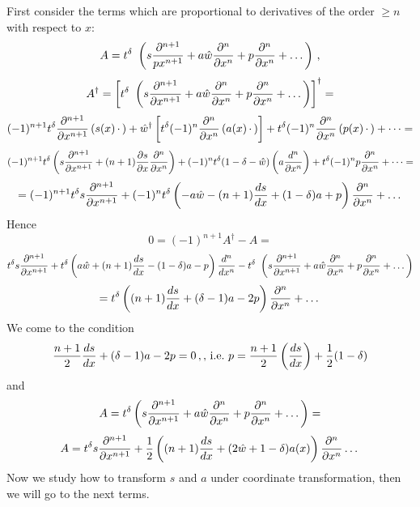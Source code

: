 First consider the terms which are proportional to derivatives of the order $\geq n$ with respect to $x$:
           $$
       A=t^\delta\
          \left(
    s{\partial^{n+1}\over p x^{n+1}}
        +a\hat w {\partial^{n}\over \partial x^{n}}+
    p{\partial^{n}\over \partial x^{n}}
               +
            \dots
          \right)\,,
           $$
             $$
           A^\dagger=
             \left[
            t^\delta\
          \left(
    s{\partial^{n+1}\over \partial x^{n+1}}
        +a\hat w {\partial^{n}\over \partial x^{n}}+
    p{\partial^{n}\over \partial x^{n}}
               +
            \dots
          \right)
          \right]^\dagger=
             $$
        $$
        (-1)^{n+1}
    t^\delta {\partial^{n+1}\over \partial x^{n+1}}
    \left(s(x) \,\cdot\,\right)+
    \hat w^\dagger\left[t^\delta (-1)^n{\partial^{n}\over \partial x^{n}} \left(a(x) \,\cdot\,\right)\right]+
    t^\delta (-1)^n{\partial^{n}\over \partial x^{n}} \left(p(x) \,\cdot\,\right)+\dots=
        $$
        $$
        (-1)^{n+1}t^\delta
        \left(
    s{\partial^{n+1}\over \partial x^{n+1}}
    + (n+1) {\partial s\over \partial x}{\partial^{n}\over \partial x^{n}}\right)+
            (-1)^nt^\delta(1-\delta-\hat w)\left(a{d^{n}\over \partial x^{n}}\right)+
    t^\delta (-1)^np{\partial^{n}\over \partial x^{n}}+\dots=
        $$
        $$
=   (-1)^{n+1}
            t^\delta s{\partial^{n+1}\over \partial x^{n+1}}
    +
            (-1)^nt^\delta
            \left(-a\hat w
            -(n+1) {ds\over dx}
            +(1-\delta) a+
             p\right){\partial^{n}\over \partial x^{n}}
        +\dots
                $$
Hence
                  $$
      0=  (-1)^{n+1}A^\dagger-A=
                   $$
                   $$
       t^\delta s{\partial ^{n+1}\over \partial x^{n+1}}
                  +
            t^\delta
            \left(a\hat w
            +(n+1) {ds\over dx}
            -(1-\delta) a-
             p\right){d^{n}\over dx^{n}}
             -t^\delta\
          \left(
    s{\partial^{n+1}\over \partial x^{n+1}}
        +a\hat w {\partial^{n}\over \partial x^{n}}+
    p{\partial^{n}\over \partial x^{n}}
               +
            \dots
          \right)
                  $$
                  $$
      =t^\delta
            \left((n+1) {ds\over dx}
            +(\delta-1) a-2p
               \right){\partial^{n}\over \partial x^{n}}+\dots
                  $$
    We come to the condition
               $$
               {n+1\over 2}{ds\over dx}
            +(\delta-1) a-2p=0\,,,\,{\rm i.e.}\,\, p={n+1\over 2}\left({ds\over dx}\right)+
{1\over 2}(1-\delta)
               $$
          and
         $$
       A=t^\delta
          \left(
    s{\partial^{n+1}\over \partial x^{n+1}}
        +a\hat w {\partial^{n}\over \partial x^{n}}+
    p{\partial^{n}\over \partial x^{n}}
               +
            \dots
          \right)=
          $$
          $$
          A=t^\delta
    s{\partial^{n+1}\over \partial x^{n+1}}
        +{1\over 2}
        \left(
        (n+1){ds\over dx}+
        (2\hat w+1-\delta)a(x)
               \right) {\partial^{n}\over \partial x^{n}}
            \dots
          $$
Now we study how to transform $s$ and $a$ under coordinate transformation, then we will go to the
next terms.

